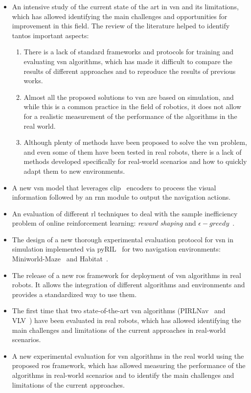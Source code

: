 \begin{itemize}
    \item An intensive study of the current state of the art in \acrshort{vsn} and its limitations, which has allowed identifying the main challenges and opportunities for improvement in this field.
    The review of the literature helped to identify tantos important aspects:
        \begin{enumerate}
            \item There is a lack of standard frameworks and protocols for training and evaluating \acrshort{vsn} algorithms, which has made it difficult to compare the results of different approaches and to reproduce the results of previous works.
            \item Almost all the proposed solutions to \acrshort{vsn} are based on simulation, and while this is a common practice in the field of robotics, it does not allow for a realistic measurement of the performance of the algorithms in the real world.
            \item Although plenty of methods have been proposed to solve the \acrshort{vsn} problem, and even some of them have been tested in real robots, there is a lack of methods developed specifically for real-world scenarios and how to quickly adapt them to new environments.
        \end{enumerate}
    \item A new \acrshort{vsn} model that leverages \acrshort{clip}~\cite{radford2021} encoders to process the visual information followed by an \acrshort{rnn} module to output the navigation actions.
    \item An evaluation of different \acrshort{rl} techniques to deal with the sample inefficiency~\cite{Yarats2019ImprovingSE} problem of online reinforcement learning: \textit{reward shaping} and $\epsilon-greedy$~\cite{mnih2013}.
    \item The design of a new thorough experimental evaluation protocol for \acrshort{vsn} in simulation implemented via pyRIL~\cite{pyRIL} for two navigation environments: Miniworld-Maze~\cite{gym_miniworld} and Habitat~\cite{szot2021}.
    \item The release of a new \acrshort{ros} framework for deployment of \acrshort{vsn} algorithms in real robots.
    It allows the integration of different algorithms and environments and provides a standardized way to use them.
    \item The first time that two state-of-the-art \acrshort{vsn} algorithms (PIRLNav~\cite{ramrakhya2023} and VLV~\cite{chang2020}) have been evaluated in real robots, which has allowed identifying the main challenges and limitations of the current approaches in real-world scenarios.
    \item A new experimental evaluation for \acrshort{vsn} algorithms in the real world using the proposed \acrshort{ros} framework, which has allowed measuring the performance of the algorithms in real-world scenarios and to identify the main challenges and limitations of the current approaches.
\end{itemize}


